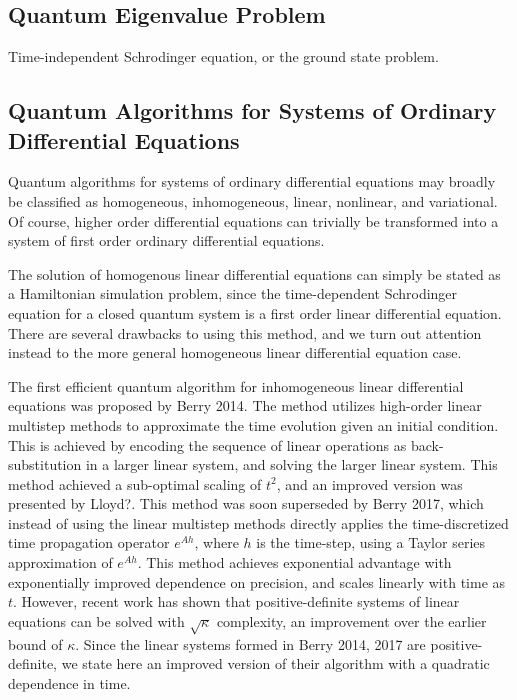 \documentclass{article}
\begin{document}
\subsection{Quantum Eigenvalue Problem}

Time-independent Schrodinger equation, or the ground state problem.


\subsection{Quantum Algorithms for Systems of Ordinary Differential Equations}

Quantum algorithms for systems of ordinary differential equations may broadly be classified as homogeneous, inhomogeneous, linear, nonlinear, and variational. Of course, higher order differential equations can trivially be transformed into a system of first order ordinary differential equations.

The solution of homogenous linear differential equations can simply be stated as a Hamiltonian simulation problem, since the time-dependent Schrodinger equation for a closed quantum system is a first order linear differential equation. There are several drawbacks to using this method, and we turn out attention instead to the more general homogeneous linear differential equation case.


The first efficient quantum algorithm for inhomogeneous linear differential equations was proposed by {Berry 2014}. The method utilizes high-order linear multistep methods to approximate the time evolution given an initial condition. This is achieved by encoding the sequence of linear operations as back-substitution in a larger linear system, and solving the larger linear system. This method achieved a sub-optimal scaling of $t^2$, and an improved version was presented by {Lloyd}?. This method was soon superseded by {Berry 2017}, which instead of using the linear multistep methods directly applies the time-discretized time propagation operator $e^{Ah}$, where $h$ is the time-step, using a Taylor series approximation of $e^{Ah}$. This method achieves exponential advantage with exponentially improved dependence on precision, and scales linearly with time as $t$. However, recent work has shown that positive-definite systems of linear equations can be solved with $\sqrt{\kappa}$ complexity, an improvement over the earlier bound of $\kappa$. Since the linear systems formed in {Berry 2014, 2017} are positive-definite, we state here an improved version of their algorithm with a quadratic dependence in time.
\end{document}

